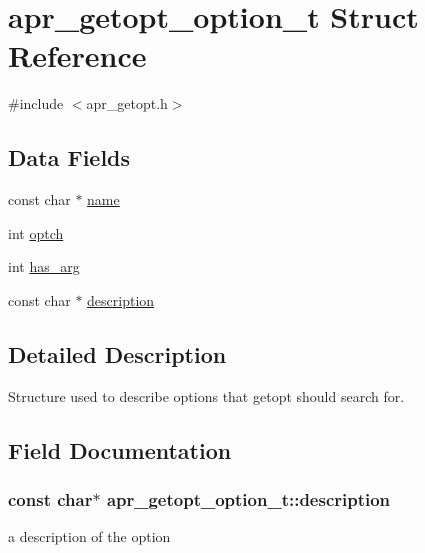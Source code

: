 \hypertarget{structapr__getopt__option__t}{}\section{apr\+\_\+getopt\+\_\+option\+\_\+t Struct Reference}
\label{structapr__getopt__option__t}


{\ttfamily \#include $<$apr\+\_\+getopt.\+h$>$}

\subsection*{Data Fields}
\begin{DoxyCompactItemize}
\item 
const char $\ast$ \hyperlink{structapr__getopt__option__t_a7e623913c9761495c5d37adf6ff1ee69}{name}
\item 
int \hyperlink{structapr__getopt__option__t_a476e67c4dde620fe5b4f5952238c6e94}{optch}
\item 
int \hyperlink{structapr__getopt__option__t_aac65dae93f6d35f4848b91f6f9d66278}{has\+\_\+arg}
\item 
const char $\ast$ \hyperlink{structapr__getopt__option__t_a8fd515c0a9e621f6c0d058772429ab98}{description}
\end{DoxyCompactItemize}


\subsection{Detailed Description}
Structure used to describe options that getopt should search for. 

\subsection{Field Documentation}
\subsubsection[{\texorpdfstring{description}{description}}]{\setlength{\rightskip}{0pt plus 5cm}const char$\ast$ apr\+\_\+getopt\+\_\+option\+\_\+t\+::description}\hypertarget{structapr__getopt__option__t_a8fd515c0a9e621f6c0d058772429ab98}{}\label{structapr__getopt__option__t_a8fd515c0a9e621f6c0d058772429ab98}
a description of the option 
